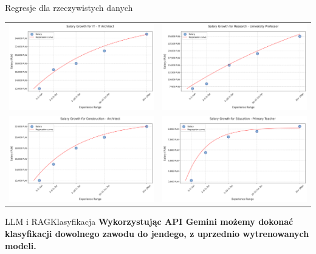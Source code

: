 \begin{frame}[t]{Regresje dla rzeczywistych danych}
\centering
\begin{tabular}{cc}
    \pause
\includegraphics[width=0.45\linewidth]{img/salary_progression2} &
    \pause
\includegraphics[width=0.45\linewidth]{img/salary_progression4} \\
    \pause
\includegraphics[width=0.45\linewidth]{img/salary_progression6} &
    \pause
\includegraphics[width=0.45\linewidth]{img/salary_progression7}
\end{tabular}
\end{frame}

\begin{frame}[t]{LLM i RAG}{Klasyfikacja}
    \textbf{Wykorzystując API Gemini możemy dokonać klasyfikacji dowolnego zawodu do jendego,
        z uprzednio wytrenowanych modeli.}
    \\
    \pause
    \\
    \pause
\end{frame}
